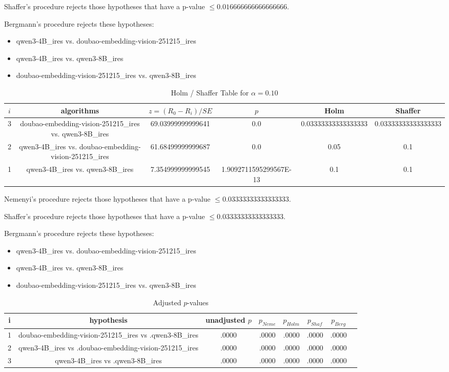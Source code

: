 \documentclass[a4paper,10pt]{article}
\begin{document}
\begin{landscape}
Shaffer's procedure rejects those hypotheses that have a p-value $\le0.016666666666666666$.


Bergmann's procedure rejects these hypotheses:


\begin{itemize}


\item qwen3-4B_ires vs. doubao-embedding-vision-251215_ires\item qwen3-4B_ires vs. qwen3-8B_ires\item doubao-embedding-vision-251215_ires vs. qwen3-8B_ires\end{itemize}


\begin{table}[!htp]
\centering\tiny
\caption{Holm / Shaffer Table for $\alpha=0.10$}
\begin{tabular}{cccccc}
$i$&algorithms&$z=(R_0 - R_i)/SE$&$p$&Holm&Shaffer\\
\hline
3&doubao-embedding-vision-251215_ires vs. qwen3-8B_ires&69.03999999999641&0.0&0.03333333333333333&0.03333333333333333\\2&qwen3-4B_ires vs. doubao-embedding-vision-251215_ires&61.68499999999687&0.0&0.05&0.1\\1&qwen3-4B_ires vs. qwen3-8B_ires&7.354999999999545&1.9092711595299567E-13&0.1&0.1\\\hline
\end{tabular}
\end{table}
Nemenyi's procedure rejects those hypotheses that have a p-value $\le0.03333333333333333$.


Shaffer's procedure rejects those hypotheses that have a p-value $\le0.03333333333333333$.


Bergmann's procedure rejects these hypotheses:


\begin{itemize}


\item qwen3-4B_ires vs. doubao-embedding-vision-251215_ires
\item qwen3-4B_ires vs. qwen3-8B_ires
\item doubao-embedding-vision-251215_ires vs. qwen3-8B_ires
\end{itemize}


\begin{table}[!htp]
\centering\tiny
\caption{Adjusted $p$-values}
\begin{tabular}{cccccccc}
i&hypothesis&unadjusted $p$&$p_{Neme}$&$p_{Holm}$&$p_{Shaf}$&$p_{Berg}$\\
\hline
1&doubao-embedding-vision-251215_ires vs .qwen3-8B_ires&.0000&.0000&.0000&.0000&.0000\\2&qwen3-4B_ires vs .doubao-embedding-vision-251215_ires&.0000&.0000&.0000&.0000&.0000\\3&qwen3-4B_ires vs .qwen3-8B_ires&.0000&.0000&.0000&.0000&.0000\\\hline
\end{tabular}
\end{table}

\end{landscape}
\end{document}
